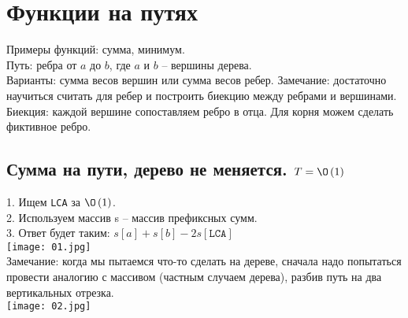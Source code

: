 \section{Функции на путях}
	Примеры функций: сумма, минимум.\\
	Путь: ребра от $a$ до $b$, где $a$ и $b$ -- вершины дерева. \\
	Варианты: сумма весов вершин или сумма весов ребер. Замечание: достаточно научиться считать для ребер и построить биекцию между ребрами и вершинами.\\
	Биекция: каждой вершине сопоставляем ребро в отца. Для корня можем сделать фиктивное ребро. \\

  \subsection{Сумма на пути, дерево не меняется. $T = \O\left(1\right)$}
	1. Ищем \texttt{LCA} за $\O\left(1\right)$. \\
	2. Используем массив s -- массив префиксных сумм. \\
	3. Ответ будет таким: $s[a] + s[b] - 2s[\texttt{LCA}]$ \\

\texttt{[image: 01.jpg]}\\

	Замечание: когда мы пытаемся что-то сделать на дереве, сначала надо попытаться провести аналогию с массивом (частным случаем дерева), разбив путь на два вертикальных отрезка. \\
  
\texttt{[image: 02.jpg]}\\

